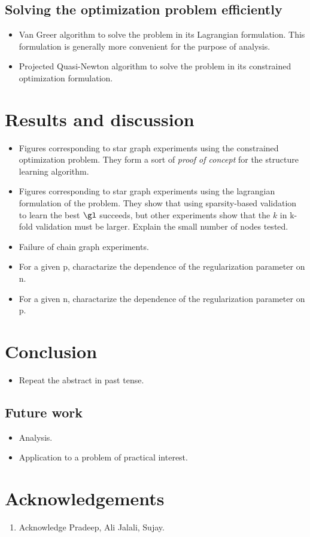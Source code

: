 \documentclass{article}
\begin{document}
\subsection{Solving the optimization problem efficiently}
\begin{itemize}
 \item Van Greer algorithm to solve the problem in its Lagrangian formulation. This formulation is generally more convenient for the purpose of analysis.
 \item Projected Quasi-Newton algorithm to solve the problem in its constrained optimization formulation.
\end{itemize}


\section{Results and discussion}
\begin{itemize}
 \item Figures corresponding to star graph experiments using the constrained optimization problem. They form a sort of \textit{proof of concept} for the structure learning algorithm.
 \item Figures corresponding to star graph experiments using the lagrangian formulation of the problem. They show that using sparsity-based validation to learn the best $\gl$ succeeds, but other experiments show that the $k$ in k-fold validation must be larger. Explain the small number of nodes tested.
 \item Failure of chain graph experiments.
 \item For a given p, charactarize the dependence of the regularization parameter on n.
 \item For a given n, charactarize the dependence of the regularization parameter on p.
\end{itemize}


\section{Conclusion}
\begin{itemize}
 \item Repeat the abstract in past tense.
\end{itemize}

\subsection{Future work}
\begin{itemize}
 \item Analysis.
 \item Application to a problem of practical interest.
\end{itemize}

\section{Acknowledgements}
\begin{enumerate}
 \item Acknowledge Pradeep, Ali Jalali, Sujay.
\end{enumerate}


% 
% 
\end{document}
